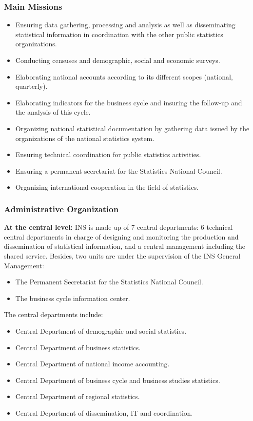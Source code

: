 \documentclass[12pt,a4paper]{report}
\begin{document}
\subsubsection*{Main Missions}
\begin{itemize}
    \item Ensuring data gathering, processing and analysis as well as disseminating statistical information in coordination with the other public statistics organizations.
    \item Conducting censuses and demographic, social and economic surveys.
    \item Elaborating national accounts according to its different scopes (national, quarterly).
    \item Elaborating indicators for the business cycle and insuring the follow-up and the analysis of this cycle.
    \item Organizing national statistical documentation by gathering data issued by the organizations of the national statistics system.
    \item Ensuring technical coordination for public statistics activities.
    \item Ensuring a permanent secretariat for the Statistics National Council.
    \item Organizing international cooperation in the field of statistics.
\end{itemize}

\subsubsection*{Administrative Organization}
\textbf{At the central level:} INS is made up of 7 central departments: 6 technical central departments in charge of designing and monitoring the production and dissemination of statistical information, and a central management including the shared service. Besides, two units are under the supervision of the INS General Management:
\begin{itemize}
    \item The Permanent Secretariat for the Statistics National Council.
    \item The business cycle information center.
\end{itemize}

The central departments include:
\begin{itemize}
    \item Central Department of demographic and social statistics.
    \item Central Department of business statistics.
    \item Central Department of national income accounting.
    \item Central Department of business cycle and business studies statistics.
    \item Central Department of regional statistics.
    \item Central Department of dissemination, IT and coordination.
\end{itemize}
\end{document}

